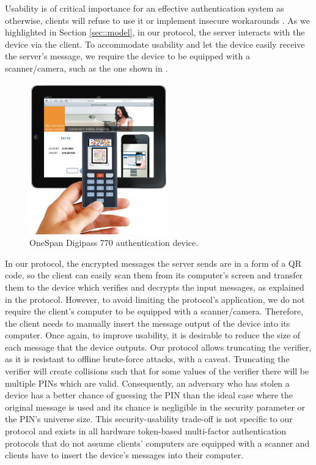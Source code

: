 \documentclass[runningheads]{llncs}
\begin{document}
Usability is of critical importance for an effective authentication system as otherwise, clients will refuse to use it or implement insecure workarounds \cite{de2013comparative}.
As we highlighted in Section \ref{sec::model}, in our protocol, the server interacts with the device via the client. To accommodate usability and let the device easily receive the server's message, we require the device to be equipped with a scanner/camera, such as the one shown in . 


\begin{figure}
    \centering
    \includegraphics[width=6cm]{dp770}
    \caption{OneSpan Digipass 770 authentication device.}
    \label{fig:dp770}
\end{figure}


In our protocol, the encrypted messages the server sends are in a form of a QR code, so the client can easily scan them from its computer's screen and transfer them to the device which verifies and decrypts the input messages, as explained in the protocol. However, to avoid limiting the protocol's application, we do not require the client's computer to be equipped with a scanner/camera. Therefore, the client needs to manually insert the message output of the device into its computer.  Once again, to improve usability, it is desirable to reduce the size of each message that the device outputs. {Our protocol allows truncating the verifier, as it is resistant to offline brute-force attacks, with a caveat. Truncating the verifier will create collisions such that for some values of the verifier there will be multiple PINs which are valid. Consequently, an adversary who has stolen a device has a better chance of guessing the PIN than the ideal case where the original message is used and its chance is negligible in the security parameter or the PIN's universe size.} This security-usability trade-off is not specific to our protocol and exists in all hardware token-based multi-factor authentication protocols that do not assume clients' computers are equipped with a scanner and clients have to insert the device's messages into their computer.  
\end{document}
